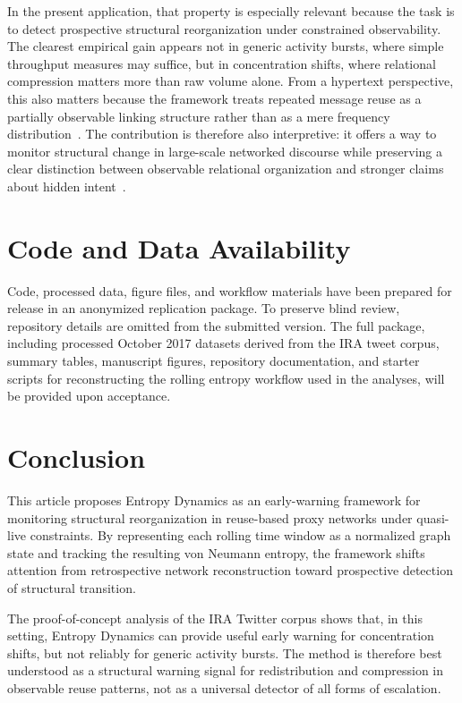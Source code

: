 \documentclass[sigconf]{acmart}
\begin{document}
In the present application, that property is especially relevant because the task is to detect prospective structural reorganization under constrained observability. The clearest empirical gain appears not in generic activity bursts, where simple throughput measures may suffice, but in concentration shifts, where relational compression matters more than raw volume alone. From a hypertext perspective, this also matters because the framework treats repeated message reuse as a partially observable linking structure rather than as a mere frequency distribution~\cite{Carrino2024,LiadiGraus2023}. The contribution is therefore also interpretive: it offers a way to monitor structural change in large-scale networked discourse while preserving a clear distinction between observable relational organization and stronger claims about hidden intent~\cite{Carrino2024,LiadiGraus2023,GhoshRanu2023,AyoobiEtAl2024}.

\section{Code and Data Availability}
\label{sec:dataavailability}

Code, processed data, figure files, and workflow materials have been prepared for release in an anonymized replication package. To preserve blind review, repository details are omitted from the submitted version. The full package, including processed October 2017 datasets derived from the IRA tweet corpus, summary tables, manuscript figures, repository documentation, and starter scripts for reconstructing the rolling entropy workflow used in the analyses, will be provided upon acceptance.

\section{Conclusion}
\label{sec:conclusion}

This article proposes Entropy Dynamics as an early-warning framework for monitoring structural reorganization in reuse-based proxy networks under quasi-live constraints. By representing each rolling time window as a normalized graph state and tracking the resulting von Neumann entropy, the framework shifts attention from retrospective network reconstruction toward prospective detection of structural transition.

The proof-of-concept analysis of the IRA Twitter corpus shows that, in this setting, Entropy Dynamics can provide useful early warning for concentration shifts, but not reliably for generic activity bursts. The method is therefore best understood as a structural warning signal for redistribution and compression in observable reuse patterns, not as a universal detector of all forms of escalation.
\end{document}

